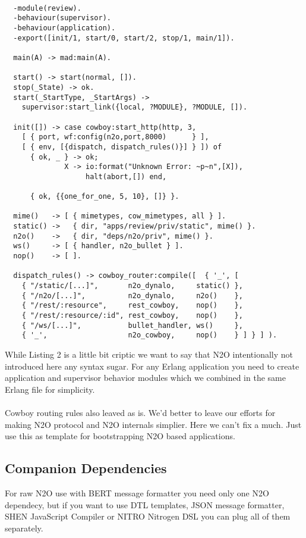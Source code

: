 \vspace{1\baselineskip}
\begin{lstlisting}[caption=review.erl]

  -module(review).
  -behaviour(supervisor).
  -behaviour(application).
  -export([init/1, start/0, start/2, stop/1, main/1]).

  main(A) -> mad:main(A).

  start() -> start(normal, []).
  stop(_State) -> ok.
  start(_StartType, _StartArgs) ->
    supervisor:start_link({local, ?MODULE}, ?MODULE, []).

  init([]) -> case cowboy:start_http(http, 3,
    [ { port, wf:config(n2o,port,8000)      } ],
    [ { env, [{dispatch, dispatch_rules()}] } ]) of
      { ok, _ } -> ok;
              X -> io:format("Unknown Error: ~p~n",[X]),
                   halt(abort,[]) end,

      { ok, {{one_for_one, 5, 10}, []} }.

  mime()   -> [ { mimetypes, cow_mimetypes, all } ].
  static() ->   { dir, "apps/review/priv/static", mime() }.
  n2o()    ->   { dir, "deps/n2o/priv", mime() }.
  ws()     -> [ { handler, n2o_bullet } ].
  nop()    -> [ ].

  dispatch_rules() -> cowboy_router:compile([  { '_', [
    { "/static/[...]",       n2o_dynalo,     static() },
    { "/n2o/[...]",          n2o_dynalo,     n2o()    },
    { "/rest/:resource",     rest_cowboy,    nop()    },
    { "/rest/:resource/:id", rest_cowboy,    nop()    },
    { "/ws/[...]",           bullet_handler, ws()     },
    { '_',                   n2o_cowboy,     nop()    } ] } ] ).
\end{lstlisting}
\vspace{1\baselineskip}

\newpage
While Listing 2 is a little bit criptic we want to say that N2O
intentionally not introduced here any syntax sugar.
For any Erlang application you need to create application
and supervisor behavior modules which we combined in the
same Erlang file for simplicity.

\paragraph{}
Cowboy routing rules also leaved as is.
We'd better to leave our efforts for making N2O protocol
and N2O internals simplier. Here we can't fix a much. Just use this
as template for bootstrapping N2O based applications.

\subsection{Companion Dependencies}
For raw N2O use with BERT message formatter you need only
one N2O dependecy, but if you want to use DTL templates,
JSON message formatter, SHEN JavaScript Compiler or NITRO
Nitrogen DSL you can plug all of them separately.

